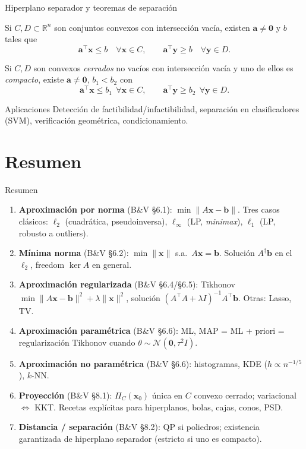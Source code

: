 \documentclass[10pt,aspectratio=169]{beamer}
\newcommand{\R}{\mathbb{R}}
\newcommand{\x}{\mathbf{x}}
\newcommand{\y}{\mathbf{y}}
\newcommand{\xb}{\mathbf{b}}
\newcommand{\xa}{\mathbf{a}}
\newcommand{\0}{\mathbf{0}}
\newcommand{\1}{\mathbf{1}}
\begin{document}
\begin{frame}{Hiperplano separador y teoremas de separación}
  \begin{theorem}
    Si $C,D\subset\R^n$ son conjuntos convexos con intersección vacía,
    existen $\xa\neq\0$ y $b$ tales que
    \[
      \xa^\top\x \le b\quad\forall\x\in C,
      \qquad
      \xa^\top\y \ge b\quad\forall\y\in D.
    \]
  \end{theorem}
  \begin{theorem}
    Si $C,D$ son convexos \emph{cerrados} no vacíos con intersección
    vacía y uno de ellos es \emph{compacto}, existe $\xa\neq\0,\,
    b_1<b_2$ con
    \[
      \xa^\top\x \le b_1\ \ \forall\x\in C,\qquad
      \xa^\top\y \ge b_2\ \ \forall\y\in D.
    \]
  \end{theorem}
  \begin{alertblock}{Aplicaciones}
    Detección de factibilidad/infactibilidad, separación en clasificadores
    (SVM), verificación geométrica, condicionamiento.
  \end{alertblock}
\end{frame}

\section{Resumen}
\begin{frame}{Resumen}
  \begin{enumerate}
    \item \textbf{Aproximación por norma} (B\&V §6.1): $\min\|A\x-\xb\|$.
          Tres casos clásicos: $\ell_2$ (cuadrática, pseudoinversa),
          $\ell_\infty$ (LP, \emph{minimax}), $\ell_1$ (LP, robusto a outliers).
    \item \textbf{Mínima norma} (B\&V §6.2): $\min\|\x\|$ s.a.\ $A\x=\xb$.
          Solución $A^\dagger\xb$ en el $\ell_2$, freedom $\ker A$ en general.
    \item \textbf{Aproximación regularizada} (B\&V §6.4/§6.5):
          Tikhonov $\min\|A\x-\xb\|^2+\lambda\|\x\|^2$, solución
          $(A^\top A+\lambda I)^{-1}A^\top\xb$. Otras: Lasso, TV.
    \item \textbf{Aproximación paramétrica} (B\&V §6.6): ML,
          MAP = ML + priori = regularización Tikhonov cuando
          $\theta\sim\mathcal{N}(\0,\tau^2 I)$.
    \item \textbf{Aproximación no paramétrica} (B\&V §6.6): histogramas,
          KDE ($h\propto n^{-1/5}$), $k$-NN.
    \item \textbf{Proyección} (B\&V §8.1): $\Pi_C(\x_0)$ única en
          $C$ convexo cerrado; variacional $\Leftrightarrow$ KKT.
          Recetas explícitas para hiperplanos, bolas, cajas, conos, PSD.
    \item \textbf{Distancia / separación} (B\&V §8.2): QP si poliedros;
          existencia garantizada de hiperplano separador (estricto si uno
          es compacto).
  \end{enumerate}
\end{frame}
\end{document}
